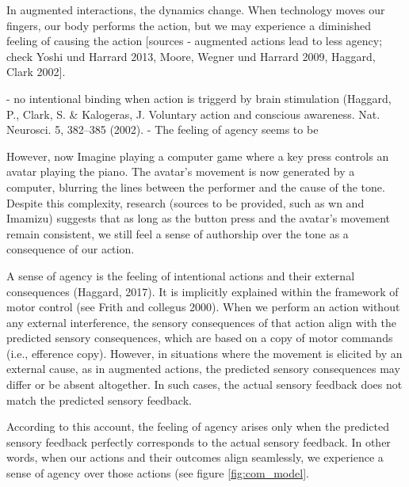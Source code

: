 In augmented interactions, the dynamics change. When technology moves our fingers, our body performs the action, but we may experience a diminished feeling of causing the action [sources - augmented actions lead to less agency; check Yoshi und Harrard 2013, Moore, Wegner und Harrard 2009, Haggard, Clark 2002]. 

- no intentional binding when action is triggerd by brain stimulation  (Haggard, P., Clark, S. & Kalogeras, J. Voluntary action and conscious awareness. Nat. Neurosci. 5, 382–385 (2002).
- 
The feeling of agency seems to be 

However, now  Imagine playing a computer game where a key press controls an avatar playing the piano. The avatar's movement is now generated by a computer, blurring the lines between the performer and the cause of the tone. Despite this complexity, research (sources to be provided, such as wn and Imamizu) suggests that as long as the button press and the avatar's movement remain consistent, we still feel a sense of authorship over the tone as a consequence of our action.


A sense of agency is the feeling of intentional actions and their external consequences (Haggard, 2017).
It is implicitly explained within the framework of motor control (see Frith and collegus 2000). When we perform an action without any external interference, the sensory consequences of that action align with the predicted sensory consequences, which are based on a copy of motor commands (i.e., efference copy). However, in situations where the movement is elicited by an external cause, as in augmented actions, the predicted sensory consequences may differ or be absent altogether. In such cases, the actual sensory feedback does not match the predicted sensory feedback. 

According to this account, the feeling of agency arises only when the predicted sensory feedback perfectly corresponds to the actual sensory feedback. In other words, when our actions and their outcomes align seamlessly, we experience a sense of agency over those actions (see figure \ref{fig:com_model}. 




